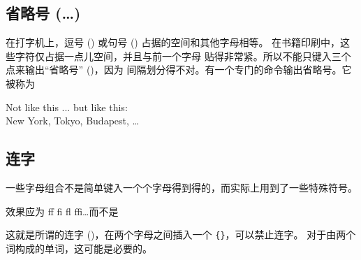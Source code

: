 \subsection{省略号\texorpdfstring{ (\ldots )}{( ... )}}

在打字机上，逗号 () 或句号 () 占据的空间和其他字母相等。
在书籍印刷中，这些字符仅占据一点儿空间，并且与前一个字母
贴得非常紧。所以不能只键入三个点来输出“省略号” ()，因为
间隔划分得不对。有一个专门的命令输出省略号。它被称为

\begin{lscommand}
\end{lscommand}


%
\begin{example}
Not like this ... but like
this:\\ New York, Tokyo,
Budapest, \ldots
\end{example}

\subsection{连字}

一些字母组合不是简单键入一个个字母得到得的，而实际上用到了一些特殊符号。
\begin{code}
效果应为 {\large ff fi fl ffi\ldots}\quad 而不是%
\end{code}
这就是所谓的连字 ()，在两个字母之间插入一个 \verb|{}|，可以禁止连字。
对于由两个词构成的单词，这可能是必要的。

